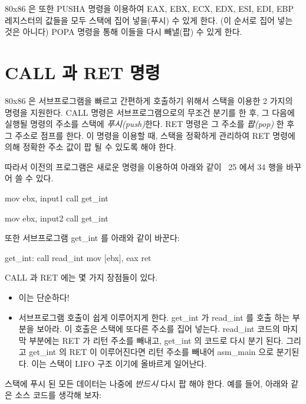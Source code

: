 80x86 은 또한 {\code PUSHA} 명령을 이용하여 EAX, EBX, ECX, EDX, ESI, EDI, EBP 
레지스터의 값들을 모두 스택에 집어 넣을(푸시) 수 있게 한다. (이 순서로 집어 넣는 것은 아니다) 
{\code POPA} 명령을 통해 이들을 다시 빼낼(팝) 수 있게 한다.


\section{CALL 과 RET 명령}
80x86 은 서브프로그램을 빠르고 간편하게 호출하기 위해서 스택을 이용한 2 가지의
명령을 지원한다. CALL 명령은 서브프로그램으로의 무조건 분기를 한 후, 그 다음에 
실행될 명령의 주소를 스택에 \emph{푸시(push)}한다. RET 명령은 그 주소를 \emph{팝(pop)} 한 후
그 주소로 점프를 한다. 이 명령을 이용할 때, 스택을 정확하게 관리하여 RET 명령에 의해
정확한 주소 값이 팝 될 수 있도록 해야 한다. 

따라서 이전의 프로그램은 새로운 명령을 이용하여 아래와 같이 ~25 에서 34 행을 바꾸어 
쓸 수 있다. 

\begin{AsmCodeListing}[numbers=none]
      mov    ebx, input1
      call   get_int

      mov    ebx, input2
      call   get_int
\end{AsmCodeListing}
또한 서브프로그램 {\code get\_int} 를 아래와 같이 바꾼다:
\begin{AsmCodeListing}[numbers=none]
get_int:
      call   read_int
      mov    [ebx], eax
      ret
\end{AsmCodeListing}

CALL 과 RET 에는 몇 가지 장점들이 있다. 

\begin{itemize}
\item 이는 단순하다! 
\item 서브프로그램 호출이 쉽게 이루어지게 한다. {\code get\_int} 가 {\code read\_int} 를
호출 하는 부분을 보아라. 이 호출은 스택에 또다른 주소를 집어 넣는다. {\code read\_int}
코드의 마지막 부분에는 RET 가 리턴 주소를 빼내고, {\code get\_int} 의 코드로 
다시 분기 된다. 그리고 {\code get\_int} 의 RET 이 이루어진다면 리턴 주소를 
빼내어 {\code asm\_main} 으로 분기된다. 이는 스택이 LIFO 구조 이기에 올바르게 일어난다. 

\end{itemize}

스택에 푸시 된 모든 데이터는 나중에 \emph{반드시} 다시 팝 해야 한다.
예를 들어, 아래와 같은 소스 코드를 생각해 보자:

